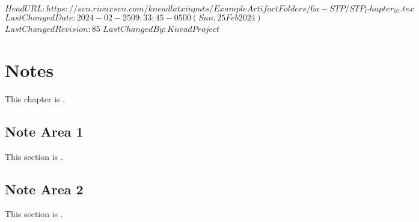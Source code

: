 \svnidlong
{$HeadURL: https://svn.riouxsvn.com/kneadlatxinputs/ExampleArtifactFolders/6a-STP/STP_Chapter_07.tex $}
{$LastChangedDate: 2024-02-25 09:33:45 -0500 (Sun, 25 Feb 2024) $}
{$LastChangedRevision: 85 $}
{$LastChangedBy: KneadProject $}

\chapter{Notes}
\label{loc:Notes}


This chapter is \TBD.

\section{Note Area 1}
\label{loc:Notes_1}


This section is \TBD.

\section{Note Area 2}
\label{loc:Notes_2}


This section is \TBD.